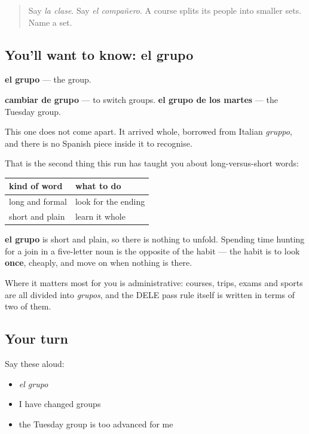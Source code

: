 \label{lesson:ES-C436-grupo}



\begin{quote}
Say \emph{la clase}. Say \emph{el compañero}. A course splits its people into smaller sets. Name a set.
\end{quote}

\subsection*{You'll want to know: el grupo}
\textbf{el grupo} — the group.

\textbf{cambiar de grupo} — to switch groups. \textbf{el grupo de los martes} — the Tuesday group.

\begin{cousinweb}
This one does not come apart. It arrived whole, borrowed from Italian \emph{gruppo}, and there is no Spanish piece inside it to recognise.

That is the second thing this run has taught you about long-versus-short words:

\noindent
\begin{tabularx}{\linewidth}{@{}>{\raggedright\arraybackslash}X>{\raggedright\arraybackslash}X@{}}
\toprule
\textbf{kind of word} & \textbf{what to do} \\
\midrule
long and formal & look for the ending \\
short and plain & learn it whole \\
\bottomrule
\end{tabularx}

\textbf{el grupo} is short and plain, so there is nothing to unfold. Spending time hunting for a join in a five-letter noun is the opposite of the habit — the habit is to look \textbf{once}, cheaply, and move on when nothing is there.

Where it matters most for you is administrative: courses, trips, exams and sports are all divided into \emph{grupos}, and the DELE pass rule itself is written in terms of two of them.
\end{cousinweb}

\subsection*{Your turn}
Say these aloud:

\begin{itemize}
\raggedright
  \item \emph{el grupo}
  \item I have changed groups
  \item the Tuesday group is too advanced for me
\end{itemize}

